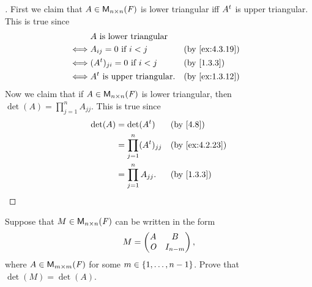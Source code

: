 \begin{proof}[]
	First we claim that \(A \in \ms[n][n][\F]\) is lower triangular iff \({A}^{t}\) is upper triangular.
	This is true since
	\begin{align*}
		     & A \text{ is lower triangular}                            \\
		\iff & A_{i j} = 0 \text{ if } i < j        &  & \by{ex:4.3.19} \\
		\iff & (\tp{A})_{j i} = 0 \text{ if } i < j &  & \by{1.3.3}     \\
		\iff & \tp{A} \text{ is upper triangular}.  &  & \by{ex:1.3.12}
	\end{align*}
	Now we claim that if \(A \in \ms[n][n][\F]\) is lower triangular, then \(\det(A) = \prod_{j = 1}^n A_{j j}\).
	This is true since
	\begin{align*}
		\det(A) & = \det(\tp{A})                   &  & \by{4.8}       \\
		        & = \prod_{j = 1}^n (\tp{A})_{j j} &  & \by{ex:4.2.23} \\
		        & = \prod_{j = 1}^n A_{j j}.       &  & \by{1.3.3}
	\end{align*}
\end{proof}

\begin{ex}\label{ex:4.3.20}
	Suppose that \(M \in \ms[n][n][\F]\) can be written in the form
	\[
		M = \begin{pmatrix}
			A   & B         \\
			\mathit{O} & I_{n - m}
		\end{pmatrix},
	\]
	where \(A \in \ms[m][m][\F]\) for some \(m \in \left\lbrace1, \dots, n - 1\right\rbrace\).
	Prove that \(\det(M) = \det(A)\).
\end{ex}

